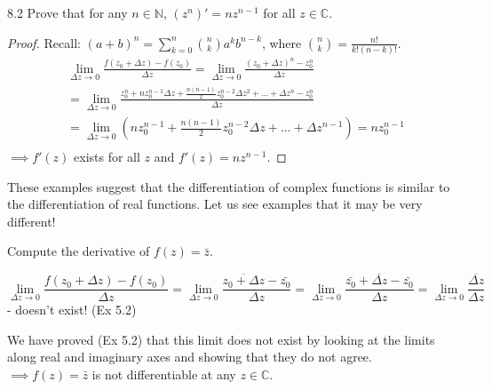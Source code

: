 \begin{example}\label{example:8.2} 8.2 Prove that for any $n \in \mathbb{N}$, $(z^n)' = nz^{n-1}$ for all $z \in \mathbb{C}$.

\begin{proof} Recall: $(a + b)^n = \sum_{k=0}^{n} \binom{n}{k} a^k b^{n-k}$, where $\binom{n}{k} = \frac{n!}{k!(n-k)!}$.
\begin{align*} & \lim_{\Delta z \to 0} \frac{f(z_0 + \Delta z) - f(z_0)}{\Delta z} = \lim_{\Delta z \to 0} \frac{(z_0 + \Delta z)^n - z_0^n}{\Delta z} \\
    & = \lim_{\Delta z \to 0} \frac{z_0^n + nz_0^{n-1}\Delta z + \frac{n(n-1)}{2}z_0^{n-2}\Delta z^2 + \dots + \Delta z^n - z_0^n}{\Delta z} \\
    & = \lim_{\Delta z \to 0} \left(nz_0^{n-1} + \frac{n(n-1)}{2}z_0^{n-2}\Delta z + \dots + \Delta z^{n-1}\right) = nz_0^{n-1} \\
\end{align*}
$\implies f'(z)$ exists for all $z$ and $f'(z) = nz^{n-1}$.
\end{proof}
\end{example}
These examples suggest that the differentiation of complex functions is similar to the differentiation of real functions. Let us see examples that it may be very different!

\begin{example} \label{example:8.3}  Compute the derivative of $f(z) = \bar{z}$.
\begin{soln}  \[ \lim_{\Delta z \to 0} \frac{f(z_0 + \Delta z) - f(z_0)}{\Delta z} = \lim_{\Delta z \to 0} \frac{\overline{z_0 + \Delta z} - \bar{z_0}}{\Delta z} = \lim_{\Delta z \to 0} \frac{\bar{z_0} + \overline{\Delta z} - \bar{z_0}}{\Delta z} = \lim_{\Delta z \to 0} \frac{\overline{\Delta z}}{\Delta z}\]
     - doesn't exist! (Ex 5.2)
\end{soln}

\end{example}
We have proved (Ex 5.2) that this limit does not exist by looking at the limits along real and imaginary axes and showing that they do not  agree.
$\implies f(z) = \bar{z}$ is not differentiable at any $z \in \mathbb{C}$.

